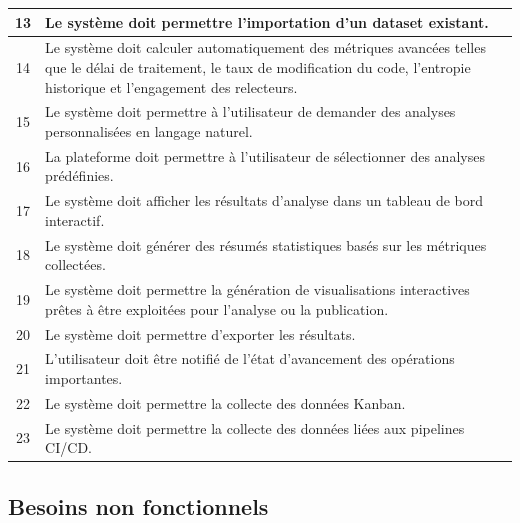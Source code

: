 \begin{center}
\begin{longtable}{|c|p{15cm}|}
    13 & Le système doit permettre l’importation d’un dataset existant. \\\hline
    14 & Le système doit calculer automatiquement des métriques avancées telles que le délai de traitement, le taux de modification du code, l’entropie historique et l’engagement des relecteurs. \\\hline
    15 & Le système doit permettre à l'utilisateur de demander des analyses personnalisées en langage naturel. \\\hline
    16 & La plateforme doit permettre à l'utilisateur de sélectionner des analyses prédéfinies. \\\hline
    17 & Le système doit afficher les résultats d’analyse dans un tableau de bord interactif. \\\hline
    18 & Le système doit générer des résumés statistiques basés sur les métriques collectées. \\\hline
    19 & Le système doit permettre la génération de visualisations interactives prêtes à être exploitées pour l’analyse ou la publication. \\\hline
    20 & Le système doit permettre d'exporter les résultats. \\\hline
    21 & L’utilisateur doit être notifié de l’état d’avancement des opérations importantes. \\\hline
    22 & Le système doit permettre la collecte des données Kanban. \\\hline
    23 & Le système doit permettre la collecte des données liées aux pipelines CI/CD. \\\hline

\end{longtable}
\end{center}
\FloatBarrier

\subsection{Besoins non fonctionnels}


